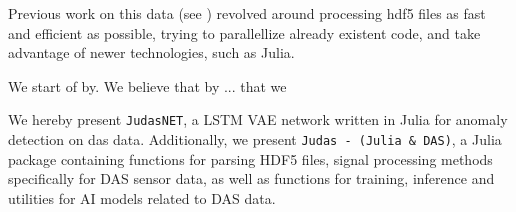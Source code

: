 Previous work on this data (see \cite{projthesis}) revolved around processing \acrshort{hdf5} files as fast and efficient as possible, trying to parallellize already existent code, and take advantage of newer technologies, such as Julia.


We start of by. We believe that by ... that we 

We hereby present \texttt{JudasNET}, a LSTM VAE network written in Julia for anomaly detection on \acrshort{das} data. Additionally, we present \texttt{Judas - (Julia \& DAS)}, a Julia package containing functions for parsing HDF5 files, signal processing methods specifically for DAS sensor data, as well as functions for training, inference and utilities for AI models related to DAS data.